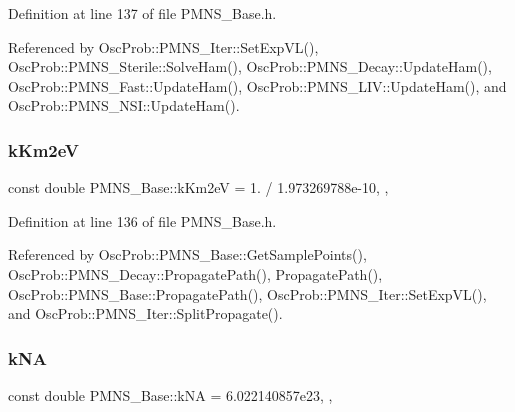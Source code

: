 Definition at line 137 of file P\+M\+N\+S\+\_\+\+Base.\+h.



Referenced by Osc\+Prob\+::\+P\+M\+N\+S\+\_\+\+Iter\+::\+Set\+Exp\+V\+L(), Osc\+Prob\+::\+P\+M\+N\+S\+\_\+\+Sterile\+::\+Solve\+Ham(), Osc\+Prob\+::\+P\+M\+N\+S\+\_\+\+Decay\+::\+Update\+Ham(), Osc\+Prob\+::\+P\+M\+N\+S\+\_\+\+Fast\+::\+Update\+Ham(), Osc\+Prob\+::\+P\+M\+N\+S\+\_\+\+L\+I\+V\+::\+Update\+Ham(), and Osc\+Prob\+::\+P\+M\+N\+S\+\_\+\+N\+S\+I\+::\+Update\+Ham().

\mbox{\label{classOscProb_1_1PMNS__Base_a382ddd7b76ca89b43f22614a2ea7327b}} 
\subsubsection{\texorpdfstring{k\+Km2eV}{kKm2eV}}
{\footnotesize\ttfamily const double P\+M\+N\+S\+\_\+\+Base\+::k\+Km2eV = 1. / 1.\+973269788e-\/10\hspace{0.3cm}{\ttfamily [static]}, {\ttfamily [protected]}, {\ttfamily [inherited]}}



Definition at line 136 of file P\+M\+N\+S\+\_\+\+Base.\+h.



Referenced by Osc\+Prob\+::\+P\+M\+N\+S\+\_\+\+Base\+::\+Get\+Sample\+Points(), Osc\+Prob\+::\+P\+M\+N\+S\+\_\+\+Decay\+::\+Propagate\+Path(), Propagate\+Path(), Osc\+Prob\+::\+P\+M\+N\+S\+\_\+\+Base\+::\+Propagate\+Path(), Osc\+Prob\+::\+P\+M\+N\+S\+\_\+\+Iter\+::\+Set\+Exp\+V\+L(), and Osc\+Prob\+::\+P\+M\+N\+S\+\_\+\+Iter\+::\+Split\+Propagate().

\mbox{\label{classOscProb_1_1PMNS__Base_a69355e770b89e99437c2b8a66e48eeb9}} 
\subsubsection{\texorpdfstring{k\+NA}{kNA}}
{\footnotesize\ttfamily const double P\+M\+N\+S\+\_\+\+Base\+::k\+NA = 6.\+022140857e23\hspace{0.3cm}{\ttfamily [static]}, {\ttfamily [protected]}, {\ttfamily [inherited]}}



